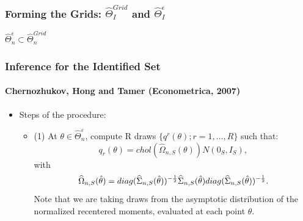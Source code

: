 \documentclass[10pt,letterpaper]{beamer}
\begin{document}
\begin{frame}
\frametitle{Forming the Grids: $\widehat{\Theta}_{I}^{Grid}$ and
$\widehat{\Theta}_{I}^{\epsilon}$}

$\widehat{\Theta }_{n}^{\epsilon }\subset \widehat{\Theta }_{n}^{Grid}$

\begin{figure}[h!]
\begin{center}
\end{center}
\end{figure}
\end{frame}


\begin{frame}
\frametitle{Inference for the Identified Set}
\framesubtitle{Chernozhukov, Hong and Tamer (Econometrica,
2007)}
\begin{itemize}
\item Steps of the procedure: 

\begin{itemize}
\item (1) At $\theta \in \widehat{\Theta }_{n}^{\varepsilon }$, compute R
draws $\{q^{r}(\theta );r=1,\dots ,R\}$ such that: 
\begin{equation*}
q_{r}(\theta )=chol(\widehat{\Omega }_{n,S}(\theta ))N(0_{S},I_{S}),
\end{equation*}%
with 
\begin{equation*}
\widehat{\Omega }_{n,S}(\hat{\theta})=diag(\widehat{\Sigma }_{n,S}(\hat{%
\theta}))^{-\frac{1}{2}}\widehat{\Sigma }_{n,S}(\hat{\theta})diag(\widehat{%
\Sigma }_{n,S}(\hat{\theta}))^{-\frac{1}{2}}.
\end{equation*}%
Note that we are taking draws from the asymptotic distribution of the
normalized recentered moments, evaluated at each point $\theta $. 
\end{itemize}
\end{itemize}
\end{frame}
\end{document}
